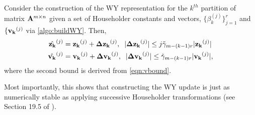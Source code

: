 \begin{lemma}\label{lem:BQR-build}
	Consider the construction of the WY representation for the $k^{th}$ partition of matrix $\mathbf{A}^{m\times n}$ given a set of Householder constants and vectors, $\{\beta_k^{(j)}\}_{j=1}^r$ and $\{\mathbf{v_k}^{(j)}$ via \cref{algo:buildWY}.
	Then, 
	\begin{align}
		\hat{\bb{z_k}}^{(j)}& = \bb{z_k}^{(j)} + \bb{\Delta z_k}^{(j)},\;\; |\bb{\Delta z_k}^{(j)}| \leq j\tilde{\gamma}_{m-(k-1)r} |\bb{z_k}^{(j)}|\label{eqn:BQR-z}\\
		\hat{\bb{v_k}}^{(j)}& = \bb{v_k}^{(j)} + \bb{\Delta v_k}^{(j)},\;\; |\bb{\Delta v_k}^{(j)}| \leq \tilde{\gamma}_{m-(k-1)r} |\bb{v_k}^{(j)}|\label{eqn:BQR-v},
	\end{align}
	where the second bound is derived from \cref{eqn:vbound}.
\end{lemma}
Most importantly, this shows that constructing the WY update is just as numerically stable as applying successive Householder transformations (see Section 19.5 of \cite{Higham2002}).
